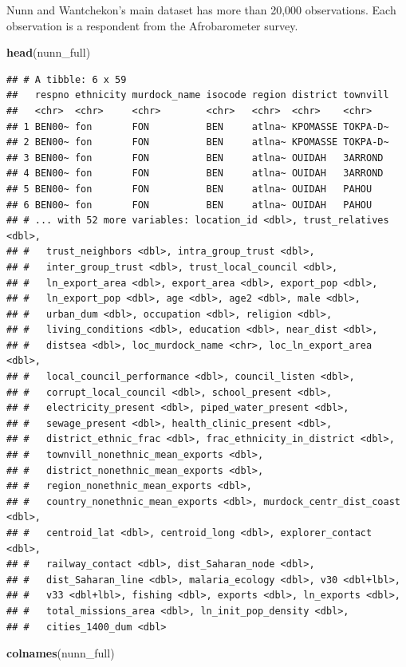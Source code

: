 \documentclass[]{book}
\newenvironment{Shaded}{\begin{snugshade}}{\end{snugshade}}
\newcommand{\KeywordTok}[1]{\textcolor[rgb]{0.13,0.29,0.53}{\textbf{#1}}}
\newcommand{\NormalTok}[1]{#1}
\theoremstyle{definition}
\theoremstyle{definition}
\theoremstyle{definition}
\theoremstyle{remark}
\begin{document}
Nunn and Wantchekon's main dataset has more than 20,000 observations.
Each observation is a respondent from the Afrobarometer survey.

\begin{Shaded}
\begin{Highlighting}[]
\KeywordTok{head}\NormalTok{(nunn_full)}
\end{Highlighting}
\end{Shaded}

\begin{verbatim}
## # A tibble: 6 x 59
##   respno ethnicity murdock_name isocode region district townvill
##   <chr>  <chr>     <chr>        <chr>   <chr>  <chr>    <chr>   
## 1 BEN00~ fon       FON          BEN     atlna~ KPOMASSE TOKPA-D~
## 2 BEN00~ fon       FON          BEN     atlna~ KPOMASSE TOKPA-D~
## 3 BEN00~ fon       FON          BEN     atlna~ OUIDAH   3ARROND 
## 4 BEN00~ fon       FON          BEN     atlna~ OUIDAH   3ARROND 
## 5 BEN00~ fon       FON          BEN     atlna~ OUIDAH   PAHOU   
## 6 BEN00~ fon       FON          BEN     atlna~ OUIDAH   PAHOU   
## # ... with 52 more variables: location_id <dbl>, trust_relatives <dbl>,
## #   trust_neighbors <dbl>, intra_group_trust <dbl>,
## #   inter_group_trust <dbl>, trust_local_council <dbl>,
## #   ln_export_area <dbl>, export_area <dbl>, export_pop <dbl>,
## #   ln_export_pop <dbl>, age <dbl>, age2 <dbl>, male <dbl>,
## #   urban_dum <dbl>, occupation <dbl>, religion <dbl>,
## #   living_conditions <dbl>, education <dbl>, near_dist <dbl>,
## #   distsea <dbl>, loc_murdock_name <chr>, loc_ln_export_area <dbl>,
## #   local_council_performance <dbl>, council_listen <dbl>,
## #   corrupt_local_council <dbl>, school_present <dbl>,
## #   electricity_present <dbl>, piped_water_present <dbl>,
## #   sewage_present <dbl>, health_clinic_present <dbl>,
## #   district_ethnic_frac <dbl>, frac_ethnicity_in_district <dbl>,
## #   townvill_nonethnic_mean_exports <dbl>,
## #   district_nonethnic_mean_exports <dbl>,
## #   region_nonethnic_mean_exports <dbl>,
## #   country_nonethnic_mean_exports <dbl>, murdock_centr_dist_coast <dbl>,
## #   centroid_lat <dbl>, centroid_long <dbl>, explorer_contact <dbl>,
## #   railway_contact <dbl>, dist_Saharan_node <dbl>,
## #   dist_Saharan_line <dbl>, malaria_ecology <dbl>, v30 <dbl+lbl>,
## #   v33 <dbl+lbl>, fishing <dbl>, exports <dbl>, ln_exports <dbl>,
## #   total_missions_area <dbl>, ln_init_pop_density <dbl>,
## #   cities_1400_dum <dbl>
\end{verbatim}

\begin{Shaded}
\begin{Highlighting}[]
\KeywordTok{colnames}\NormalTok{(nunn_full)}
\end{Highlighting}
\end{Shaded}
\end{document}
